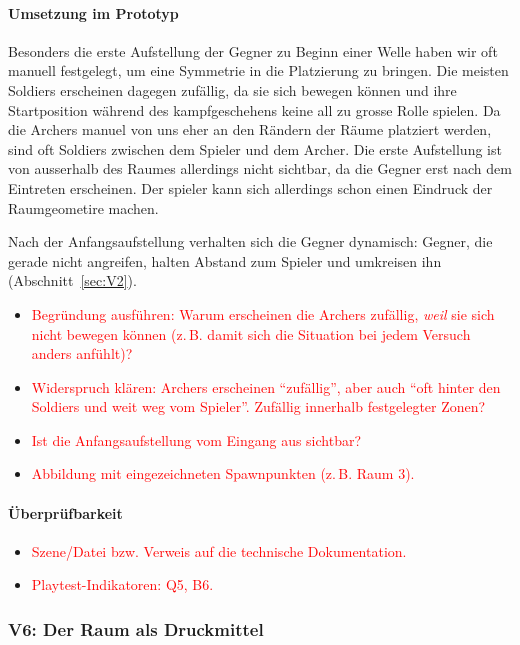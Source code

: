 \documentclass[../Main.tex]{subfiles}
\begin{document}
\paragraph{Umsetzung im Prototyp}
Besonders die erste Aufstellung der Gegner zu Beginn einer Welle haben wir oft manuell festgelegt, um eine Symmetrie in die Platzierung zu bringen. Die meisten Soldiers erscheinen dagegen zufällig, da sie sich bewegen können und ihre Startposition während des kampfgeschehens keine all zu grosse Rolle spielen. Da die Archers manuel von uns eher an den Rändern der Räume platziert werden, sind oft Soldiers zwischen dem Spieler und dem Archer. Die erste Aufstellung ist von ausserhalb des Raumes allerdings nicht sichtbar, da die Gegner erst nach dem Eintreten erscheinen. Der spieler kann sich allerdings schon einen Eindruck der Raumgeometire machen.

Nach der Anfangsaufstellung verhalten sich die Gegner dynamisch: Gegner, die gerade nicht angreifen, halten Abstand zum Spieler und umkreisen ihn (Abschnitt~\ref{sec:V2}).

\begin{itemize}[leftmargin=1.5cm]
    \item \textcolor{red}{Begründung ausführen: Warum erscheinen die Archers zufällig, \emph{weil} sie sich nicht bewegen können (z.\,B. damit sich die Situation bei jedem Versuch anders anfühlt)?}
    \item \textcolor{red}{Widerspruch klären: Archers erscheinen \enquote{zufällig}, aber auch \enquote{oft hinter den Soldiers und weit weg vom Spieler}. Zufällig innerhalb festgelegter Zonen?}
    \item \textcolor{red}{Ist die Anfangsaufstellung vom Eingang aus sichtbar?}
    \item \textcolor{red}{Abbildung mit eingezeichneten Spawnpunkten (z.\,B. Raum 3).}
\end{itemize}

\paragraph{Überprüfbarkeit}
\begin{itemize}[leftmargin=1.5cm]
    \item \textcolor{red}{Szene/Datei bzw. Verweis auf die technische Dokumentation.}
    \item \textcolor{red}{Playtest-Indikatoren: Q5, B6.}
\end{itemize}

\subsubsection{V6: Der Raum als Druckmittel} \label{sec:V6}
\end{document}
